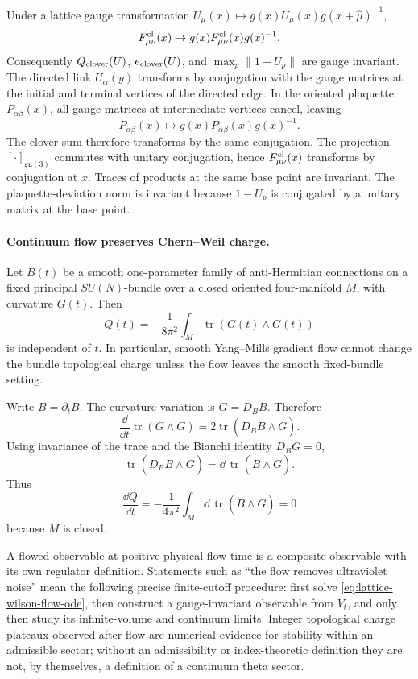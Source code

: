 \begin{remark}
\label{rem:su3-clover-diagnostic-gauge-invariance}
Under a lattice gauge transformation
\(U_\mu(x)\mapsto g(x)U_\mu(x)g(x+\widehat\mu)^{-1}\),
\[
  F_{\mu\nu}^{\rm cl}(x)\mapsto
  g(x)F_{\mu\nu}^{\rm cl}(x)g(x)^{-1}.
\]
Consequently \(Q_{\rm clover}(U)\), \(e_{\rm clover}(U)\), and
\(\max_p\|1-U_p\|\) are gauge invariant.
The directed link \(U_\alpha(y)\) transforms by conjugation with the gauge
matrices at the initial and terminal vertices of the directed edge.  In the
oriented plaquette \(P_{\alpha\beta}(x)\), all gauge matrices at intermediate
vertices cancel, leaving
\[
  P_{\alpha\beta}(x)\mapsto
  g(x)P_{\alpha\beta}(x)g(x)^{-1}.
\]
The clover sum therefore transforms by the same conjugation.  The projection
\([\cdot]_{\mathfrak{su}(3)}\) commutes with unitary conjugation, hence
\(F_{\mu\nu}^{\rm cl}(x)\) transforms by conjugation at \(x\).  Traces of
products at the same base point are invariant.  The plaquette-deviation
norm is invariant because \(1-U_p\) is conjugated by a unitary matrix at the
base point.
\end{remark}

\paragraph{Continuum flow preserves Chern--Weil charge.}
Let \(B(t)\) be a smooth one-parameter family of anti-Hermitian connections on
a fixed principal \(SU(N)\)-bundle over a closed oriented four-manifold \(M\),
with curvature \(G(t)\).  Then
\[
  Q(t)=-\frac{1}{8\pi^2}\int_M\operatorname{tr}(G(t)\wedge G(t))
\]
is independent of \(t\).  In particular, smooth Yang--Mills gradient flow
cannot change the bundle topological charge unless the flow leaves the smooth
fixed-bundle setting.

Write \(\dot B=\partial_tB\).  The curvature variation is
\(\dot G=D_B\dot B\).  Therefore
\[
  \frac{\dd}{\dd t}\operatorname{tr}(G\wedge G)
  =
  2\operatorname{tr}(D_B\dot B\wedge G).
\]
Using invariance of the trace and the Bianchi identity \(D_BG=0\),
\[
  \operatorname{tr}(D_B\dot B\wedge G)
  =
  \dd\,\operatorname{tr}(\dot B\wedge G).
\]
Thus
\[
  \frac{\dd Q}{\dd t}
  =
  -\frac{1}{4\pi^2}\int_M
  \dd\,\operatorname{tr}(\dot B\wedge G)
  =
  0
\]
because \(M\) is closed.

\begin{controlledapproximation}
\label{ca:lattice-gradient-flow-continuum-use}
A flowed observable at positive physical flow time is a composite observable
with its own regulator definition.  Statements such as ``the flow removes
ultraviolet noise'' mean the following precise finite-cutoff procedure:
first solve \eqref{eq:lattice-wilson-flow-ode}, then construct a
gauge-invariant observable from \(V_t\), and only then study its infinite-volume
and continuum limits.  Integer topological charge plateaux observed after
flow are numerical evidence for stability within an admissible sector; without
an admissibility or index-theoretic definition they are not, by themselves, a
definition of a continuum theta sector.
\end{controlledapproximation}

